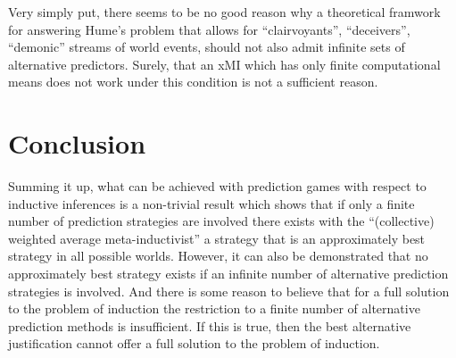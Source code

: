 \documentclass[12pt, a4paper]{article}
\numberwithin{equation}{section}
\begin{document}
Very simply put, there seems to be no good reason why a theoretical
framwork for answering Hume's problem that allows for ``clairvoyants'', 
``deceivers'', ``demonic'' streams of world events, should not also
admit infinite sets of alternative predictors. Surely, that an xMI which
has only finite computational means does not work under this
condition is not a sufficient reason. 

\section{Conclusion} 

Summing it up, what can be achieved with prediction games with respect to
inductive inferences is a non-trivial result which shows that if only a
finite number of prediction strategies are involved there exists with the
``(collective) weighted average meta-inductivist'' a strategy that is an
approximately best strategy in all possible worlds. However, it can also
be demonstrated that no approximately best strategy exists if an infinite
number of alternative prediction strategies is involved. And there is
some reason to believe that for a full solution to the problem of
induction the restriction to a finite number of alternative prediction
methods is insufficient. If this is true, then the best alternative
justification cannot offer a full solution to the problem of induction.



\end{document}
